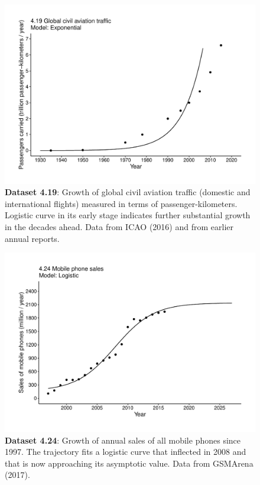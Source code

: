 \documentclass[aps,rmp,preprint,superscriptaddress,10pt,onecolumn]{article}
\begin{document}
\clearpage
\begin{figure}[h]
\includegraphics[width=\textwidth]{output/figs-ggplot/4.19.pdf}
\caption{\textbf{Dataset 4.19}: Growth of global civil aviation traffic (domestic and international flights) measured in terms of passenger-kilometers. Logistic curve in its early stage indicates further substantial growth in the decades ahead. Data from ICAO (2016) and from earlier annual reports. }
\end{figure}
	
\clearpage
\begin{figure}[h]
\includegraphics[width=\textwidth]{output/figs-ggplot/4.24.pdf}
\caption{\textbf{Dataset 4.24}: Growth of annual sales of all mobile phones since 1997. The trajectory fits a logistic curve that inflected in 2008 and that is now approaching its asymptotic value. Data from GSMArena (2017).}
\end{figure}
	
\end{document}

